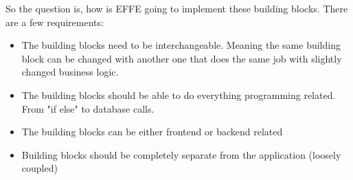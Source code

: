 So the question is, how is EFFE going to implement these building blocks. There are a few requirements:
\begin{itemize}
	\item The building blocks need to be interchangeable. Meaning the same building block can be changed with another one that does the same job with slightly changed business logic.

	\item The building blocks should be able to do everything programming related. From "if else" to database calls.

	\item The building blocks can be either frontend or backend related

	\item Building blocks should be completely separate from the application (loosely coupled)
\end{itemize}
